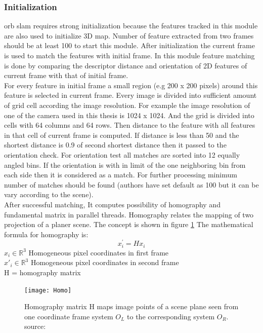 \subsubsection{Initialization}
\acrshort{orb} \acrshort{slam} requires strong initialization because the features tracked in this module are also used to initialize 3D map. Number of feature extracted from two frames should be at least 100 to start this module. After initialization the current frame is used to match the features with initial frame. In this module feature matching is done by comparing the descriptor distance and orientation of 2D features of current frame with that of initial frame.\\
\linebreak
For every feature in initial frame a small region (e.g 200 x 200 pixels) around this feature is selected in current frame. Every image is divided into sufficient amount of grid cell according the image resolution. For example the image resolution of one of the camera used in this thesis is 1024 x 1024. And the grid is divided into cells with 64 columns and 64 rows. Then distance to the feature with all features in that cell of current frame is computed. If distance is less than 50 and the shortest distance is 0.9 of second shortest distance then it passed to the orientation check. For orientation test all matches are sorted into 12 equally angled bins. If the orientation is with in limit of the one neighboring bin from each side then it is considered as a match. For further processing minimum number of matches should be found (authors have set default as 100 but it can be vary according to the scene). \\
\linebreak
After successful matching, It computes possibility of homography and fundamental matrix in parallel threads. Homography relates the mapping of two projection of a planer scene. The concept is shown in figure \ref{fig:h} The mathematical formula for homography is:
\begin{equation*}
    x^{'}_{i} = Hx_{i}    
\end{equation*}    
    $  x_{i} \in  \mathbb{R}^{3} $    Homogeneous pixel coordinates in first frame \\ 
    $  x{'}_{i} \in  \mathbb{R}^{3} $    Homogeneous pixel coordinates in second frame\\ 
    H  = homography matrix \\
\newline
\begin{figure}[h]
	\centering
	\texttt{[image: Homo]}
	\caption{Homography matrix H maps image points of a scene plane seen from one coordinate frame system $ O_{L} $ to the corresponding system $ O_{R} $.  source:\cite{multiview}}
	\label{fig:h}
\end{figure}
